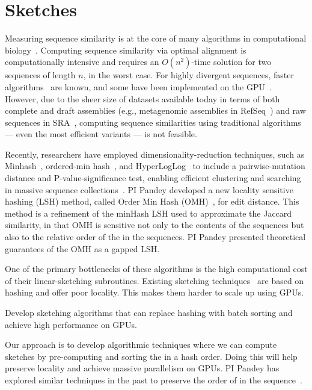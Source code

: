 
\section{Sketches}

Measuring sequence similarity is at the core of many algorithms in computational biology~\cite{Myers2000, Langmead2012,Li2010}. Computing sequence similarity via optimal alignment is computationally intensive and requires an $O(n^2)$-time solution for two sequences of length $n$, in the worst case.  For highly divergent sequences, faster algorithms~\cite{MarcoSola2023} are known, and some have been implemented on the GPU~\cite{AguadoPuig2023}. However, due to the sheer size of datasets available today in terms of both complete and draft assemblies (e.g., metagenomic assemblies in RefSeq~\cite{RefSeq}) and raw sequences in SRA~\cite{SRA}, computing sequence similarities using traditional algorithms --- even the most efficient variants --- is not feasible.

Recently, researchers have employed dimensionality-reduction techniques, such as Minhash~\cite{Broder97}, ordered-min hash~\cite{Marais2019}, and HyperLogLog~\cite{Baker2019} to include a pairwise-mutation distance and P-value-significance test, enabling  efficient clustering and searching in massive sequence collections~\cite{Mitzenmacher2014,ondov2016mash,Marais2019,Baker2019}. PI Pandey developed a new locality sensitive hashing (LSH) method, called Order Min Hash (OMH)~\cite{Marais2019}, for  edit distance. This method is a refinement of the minHash LSH used to approximate the Jaccard similarity, in that OMH is sensitive not only to the \kmer contents of the sequences but also to the relative order of the \kmers in the sequences. PI Pandey presented theoretical guarantees of the OMH as a gapped LSH\@.

One of the primary bottlenecks of these algorithms is the high computational cost of their linear-sketching subroutines. Existing sketching techniques~\cite{ondov2016mash,Marais2019} are based on hashing and offer poor locality. This makes them harder to scale up using GPUs.

\begin{rproblem}
Develop sketching algorithms that can replace hashing with batch sorting and achieve high performance on GPUs.
\end{rproblem}

Our approach is to develop algorithmic techniques where we can compute sketches by pre-computing and sorting the \kmers in a hash order. Doing this will help preserve locality and achieve massive parallelism on GPUs. PI Pandey has explored similar techniques in the past to preserve the order of \kmers in the sequence~\cite{Marais2019}.

